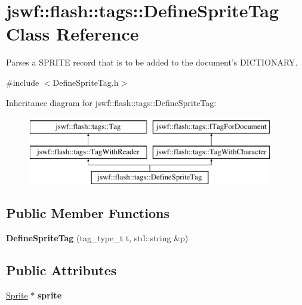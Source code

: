 \hypertarget{classjswf_1_1flash_1_1tags_1_1_define_sprite_tag}{\section{jswf\+:\+:flash\+:\+:tags\+:\+:Define\+Sprite\+Tag Class Reference}
\label{classjswf_1_1flash_1_1tags_1_1_define_sprite_tag}
}


Parses a {\ttfamily S\+P\+R\+I\+T\+E} record that is to be added to the document's {\ttfamily D\+I\+C\+T\+I\+O\+N\+A\+R\+Y}.  




{\ttfamily \#include $<$Define\+Sprite\+Tag.\+h$>$}

Inheritance diagram for jswf\+:\+:flash\+:\+:tags\+:\+:Define\+Sprite\+Tag\+:\begin{figure}[H]
\begin{center}
\leavevmode
\includegraphics[height=3.000000cm]{classjswf_1_1flash_1_1tags_1_1_define_sprite_tag}
\end{center}
\end{figure}
\subsection*{Public Member Functions}
\begin{DoxyCompactItemize}
\item 
\hypertarget{classjswf_1_1flash_1_1tags_1_1_define_sprite_tag_a84381c81d866db76cf7a75b449a25580}{{\bfseries Define\+Sprite\+Tag} (tag\+\_\+type\+\_\+t t, std\+::string \&p)}\label{classjswf_1_1flash_1_1tags_1_1_define_sprite_tag_a84381c81d866db76cf7a75b449a25580}

\end{DoxyCompactItemize}
\subsection*{Public Attributes}
\begin{DoxyCompactItemize}
\item 
\hypertarget{classjswf_1_1flash_1_1tags_1_1_define_sprite_tag_a5154f9bde28145e313ae7fba40e0fd52}{\hyperlink{classjswf_1_1flash_1_1_sprite}{Sprite} $\ast$ {\bfseries sprite}}\label{classjswf_1_1flash_1_1tags_1_1_define_sprite_tag_a5154f9bde28145e313ae7fba40e0fd52}

\end{DoxyCompactItemize}


